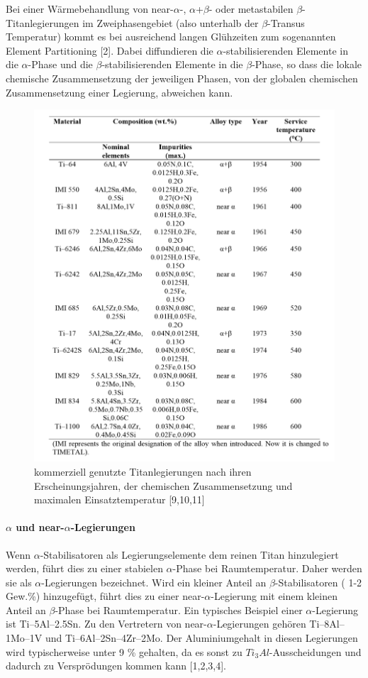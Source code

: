 Bei einer Wärmebehandlung von near-$\alpha$-, $\alpha$+$\beta$- oder metastabilen $\beta$-Titanlegierungen im Zweiphasengebiet (also unterhalb der $\beta$-Transus Temperatur) kommt es bei ausreichend langen Glühzeiten zum sogenannten Element Partitioning [2]. Dabei diffundieren die $\alpha$-stabilisierenden Elemente in die $\alpha$-Phase und die $\beta$-stabilisierenden Elemente in die $\beta$-Phase, so dass die lokale chemische Zusammensetzung der jeweiligen Phasen, von der globalen chemischen Zusammensetzung einer Legierung, abweichen kann.

\begin{figure}[h]
	\centering
	\includegraphics[width=0.8\linewidth]{"Bilder/Tabelle 2"}
	\caption[Tabelle 2]{kommerziell genutzte Titanlegierungen nach ihren Erscheinungsjahren, der chemischen Zusammensetzung und maximalen Einsatztemperatur [9,10,11]}
	\label{fig:tabelle-2}
\end{figure}

\paragraph{$\alpha$ und near-$\alpha$-Legierungen}
Wenn $\alpha$-Stabilisatoren als Legierungselemente dem reinen Titan hinzulegiert werden, führt dies zu einer stabielen $\alpha$-Phase bei Raumtemperatur. Daher werden sie als $\alpha$-Legierungen bezeichnet. Wird ein kleiner Anteil an $\beta$-Stabilisatoren ( 1-2 Gew.\%) hinzugefügt, führt dies zu einer near-$\alpha$-Legierung mit einem kleinen Anteil an $\beta$-Phase bei Raumtemperatur. Ein typisches Beispiel einer $\alpha$-Legierung ist Ti–5Al–2.5Sn. Zu den Vertretern von near-$\alpha$-Legierungen gehören Ti–8Al–1Mo–1V und Ti–6Al–2Sn–4Zr–2Mo. Der Aluminiumgehalt in diesen Legierungen wird typischerweise unter 9 \% gehalten, da es sonst zu $Ti_{3}Al$-Ausscheidungen und dadurch zu Versprödungen kommen kann [1,2,3,4].

